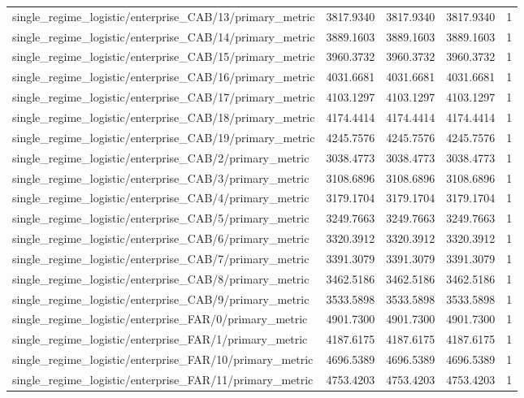 \begin{table}[h]
\begin{tabular}{lrrrr}
single_regime_logistic/enterprise_CAB/13/primary_metric & 3817.9340 & 3817.9340 & 3817.9340 & 1 \\
single_regime_logistic/enterprise_CAB/14/primary_metric & 3889.1603 & 3889.1603 & 3889.1603 & 1 \\
single_regime_logistic/enterprise_CAB/15/primary_metric & 3960.3732 & 3960.3732 & 3960.3732 & 1 \\
single_regime_logistic/enterprise_CAB/16/primary_metric & 4031.6681 & 4031.6681 & 4031.6681 & 1 \\
single_regime_logistic/enterprise_CAB/17/primary_metric & 4103.1297 & 4103.1297 & 4103.1297 & 1 \\
single_regime_logistic/enterprise_CAB/18/primary_metric & 4174.4414 & 4174.4414 & 4174.4414 & 1 \\
single_regime_logistic/enterprise_CAB/19/primary_metric & 4245.7576 & 4245.7576 & 4245.7576 & 1 \\
single_regime_logistic/enterprise_CAB/2/primary_metric & 3038.4773 & 3038.4773 & 3038.4773 & 1 \\
single_regime_logistic/enterprise_CAB/3/primary_metric & 3108.6896 & 3108.6896 & 3108.6896 & 1 \\
single_regime_logistic/enterprise_CAB/4/primary_metric & 3179.1704 & 3179.1704 & 3179.1704 & 1 \\
single_regime_logistic/enterprise_CAB/5/primary_metric & 3249.7663 & 3249.7663 & 3249.7663 & 1 \\
single_regime_logistic/enterprise_CAB/6/primary_metric & 3320.3912 & 3320.3912 & 3320.3912 & 1 \\
single_regime_logistic/enterprise_CAB/7/primary_metric & 3391.3079 & 3391.3079 & 3391.3079 & 1 \\
single_regime_logistic/enterprise_CAB/8/primary_metric & 3462.5186 & 3462.5186 & 3462.5186 & 1 \\
single_regime_logistic/enterprise_CAB/9/primary_metric & 3533.5898 & 3533.5898 & 3533.5898 & 1 \\
single_regime_logistic/enterprise_FAR/0/primary_metric & 4901.7300 & 4901.7300 & 4901.7300 & 1 \\
single_regime_logistic/enterprise_FAR/1/primary_metric & 4187.6175 & 4187.6175 & 4187.6175 & 1 \\
single_regime_logistic/enterprise_FAR/10/primary_metric & 4696.5389 & 4696.5389 & 4696.5389 & 1 \\
single_regime_logistic/enterprise_FAR/11/primary_metric & 4753.4203 & 4753.4203 & 4753.4203 & 1 \\

\end{tabular}
\end{table}
